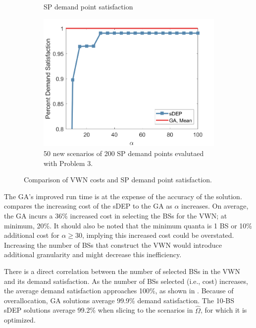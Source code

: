 \documentclass[conference]{IEEEtran}
\begin{document}
\begin{figure}[t]
\begin{subfigure}{.3\textwidth}
	\caption{SP demand point satisfaction}
	\label{fig:VWNCompSatis}
\end{subfigure}
\hspace{0.3cm}
\begin{subfigure}{.3\textwidth}
	\centering
	\includegraphics[width=1\linewidth]{Figures/ComparisonSatisfactionEval}
	\caption{50 new scenarios of 200 SP demand points evalutaed with Problem 3.}
	\label{fig:VWNCompSatisEval}
\end{subfigure}
\caption{\small Comparison of VWN costs and SP demand point satisfaction.}
\label{fig:VWNComp}
\end{figure}

The GA's improved run time is at the expense of the accuracy of the solution.   compares the increasing cost of the sDEP to the GA as $\alpha$ increases.  On average, the GA incurs a 36\% increased cost in selecting the BSs for the VWN; at minimum, 20\%.  It should also be noted that the minimum quanta is 1 BS or 10\% additional cost for $\alpha \geq 30$, implying this increased cost could be overstated.  Increasing the number of BSs that construct the VWN would introduce additional granularity and might decrease this inefficiency.

There is a direct correlation between the number of selected BSs in the VWN and its demand satisfaction.  As the number of BSs selected (i.e., cost) increases, the average demand satisfaction approaches 100\%, as shown in .  Because of overallocation, GA solutions average 99.9\% demand satisfaction.  The 10-BS sDEP solutions average 99.2\% when slicing to the scenarios in $\hat{\Omega}$, for which it is optimized.
\end{document}
